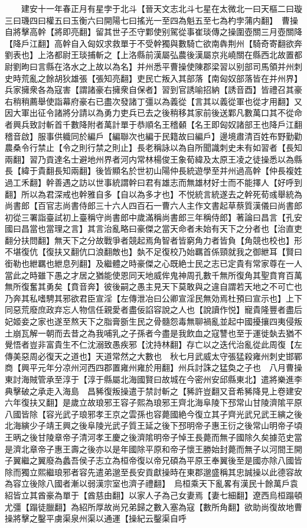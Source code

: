 　　建安十一年春正月有星孛于北斗【晉天文志北斗七星在太微北一曰天樞二曰璇三曰璣四曰權五曰玉衡六曰開陽七曰搖光一至四為魁五至七為杓孛蒲内翻】　曹操自將擊高幹【將即亮翻】留其世子丕守鄴使别駕從事崔琰傳之操圍壺關三月壺關降【降戶江翻】高幹自入匈奴求救單于不受幹獨與數騎亡欲南犇荆州【騎奇寄翻欲奔劉表也】上洛都尉王琰捕斬之【上洛縣前漢屬弘農後漢屬京兆嶢關在縣西北故置都尉劉昫曰言縣在洛水之上故以為名】并州悉平曹操使陳郡梁習以别部司馬領并州刺史時荒亂之餘胡狄雄張【張知亮翻】吏民亡叛入其部落【南匈奴部落皆在并州界】兵家擁衆各為寇害【謂諸豪右擁衆自保者】習到官誘喻招納【誘音酉】皆禮召其豪右稍稍薦舉使詣幕府豪右已盡次發諸丁彊以為義從【言其以義從軍也從才用翻】又因大軍出征令諸將分請以為勇力吏兵已去之後稍移其家前後送鄴凡數萬口其不從命者興兵致討斬首千數降附者萬計單于恭順名王稽顙【名王即匈奴諸部王也降戶江翻稽音啟】服事供軄同於編戶【編聯次也編于民籍故曰編戶】邊境肅清百姓布野勤勸農桑令行禁止【令之則行禁之則止】長老稱詠以為自所聞識刺史未有如習者【長知兩翻】習乃貢達名士避地州界者河内常林楊俊王象荀緯及太原王凌之徒操悉以為縣長【緯于貴翻長知兩翻】後皆顯名於世初山陽仲長統遊學至并州過高幹【仲長複姓過工禾翻】幹善遇之訪以世事統謂幹曰君有雄志而無雄材好士而不能擇人【好呼到翻】所以為君深戒也幹雅自多【自以為多才也】不悦統言統遂去之幹死荀彧舉統為尚書郎【百官志尚書侍郎三十六人四百石一曹六人主作文書起草蔡質漢儀曰尚書郎初從三署詣臺試初上臺稱守尚書郎中歲滿稱尚書郎三年稱侍郎】著論曰昌言【孔安國曰昌當也當理之言】其言治亂略曰豪傑之當天命者未始有天下之分者也【治直吏翻分扶問翻】無天下之分故戰爭者競起焉角智者皆窮角力者皆負【角競也校也】形不堪復伉【復扶又翻伉口浪翻敵也】埶不足復校乃始羈首係頸就我之御紲耳【賢曰銜勒也紲羈也紲息列翻】及繼體之時豪傑之心既絶士民之志已定貴有常家尊在一人當此之時雖下愚之才居之猶能使恩同天地威侔鬼神周孔數千無所復角其聖賁育百萬無所復奮其勇矣【賁音奔】彼後嗣之愚主見天下莫敢與之違自謂若天地之不可亡也乃奔其私嗜騁其邪欲君臣宣淫【左傳泄冶曰公卿宣淫民無効焉杜預曰宣示也】上下同惡荒廢庶政弃忘人物信任親愛者盡佞諂容說之人也【說讀作悦】寵貴隆豐者盡后妃姬妾之家也遂至熬天下之脂膏斵生民之骨髓怨毒無聊禍亂並起中國擾攘四夷侵叛土崩瓦解一朝而去昔之為我哺乳之子孫者今盡是我飲血之寇讐也至于運徙埶去猶不覺悟者豈非富貴生不仁沈溺致愚疾邪【沈持林翻】存亡以之迭代治亂從此周復【左傳美惡周必復天之道也】天道常然之大數也　秋七月武威太守張猛殺雍州刺史邯鄲商【興平元年分凉州河西四郡置雍州雍於用翻】州兵討誅之猛奐之子也　八月曹操東討海賊管承至淳于【淳于縣屬北海國賢曰故城在今密州安邱縣東北】遣將樂進李典擊破之承走入海島　昌豨復叛操遣于禁討斬之【豨許豈翻又音希豨降見上卷建安六年復扶又翻】是歲立故琅邪王容子熙為琅邪王齊北海阜陵下邳常山甘陵濟隂平原八國皆除【容光武子琅邪孝王京之雲孫也容薨國絶今復立其子齊光武兄武王縯之後北海縯少子靖王興之後阜陵光武子質王延之後下邳明帝子惠王衍之後常山明帝子頃王昞之後甘陵章帝子清河孝王慶之後濟隂明帝子悼王長薨而無子國除久矣據范史當是濟北章帝子惠王壽之後亦以是年國除平原和帝子懷王勝始封薨而無子以河間王開子翼繼之翼廢為蠡吾侯子志立為桓帝復以帝兄碩為平原王奉翼後至是國亦除八國皆除而獨立熙繼琅邪者容先遣弟邈至長安貢獻操時在東郡邈盛稱其忠誠操以此德容故為容立後除八國者漸以弱漢宗室也濟子禮翻】　烏桓乘天下亂畧有漢民十餘萬戶袁紹皆立其酋豪為單于【酋慈由翻】以家人子為己女妻焉【妻七細翻】遼西烏桓蹋頓尤彊【蹋徒臘翻】為紹所厚故尚兄弟歸之數入塞為寇【數所角翻】欲助尚復故地曹操將擊之鑿平虜渠泉州渠以通運【操紀云鑿渠自呼